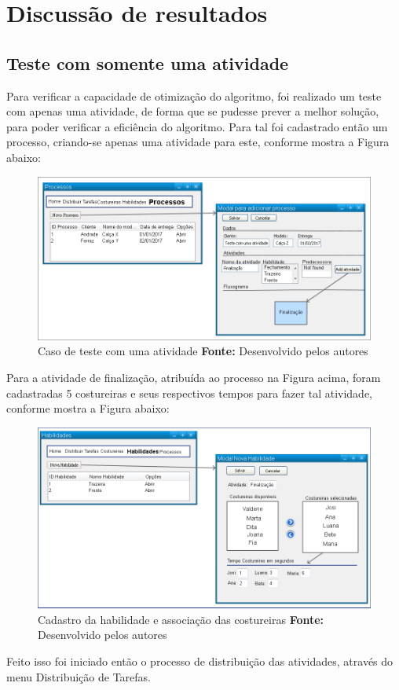 \chapter{Discussão de resultados}


\section{Teste com somente uma atividade}
\par Para verificar a capacidade de otimização do algoritmo, foi realizado um teste com apenas uma atividade,
de forma que se pudesse prever a melhor solução, para poder verificar a eficiência do algoritmo. Para tal foi 
cadastrado então um processo, criando-se apenas uma atividade para este, conforme mostra a Figura abaixo:

\begin{figure}[h!]
	\centerline{\includegraphics[scale=0.4]{./imagens/test_case_1.png}}
	\caption[Caso de teste]
	{Caso de teste com uma atividade \textbf{Fonte:} Desenvolvido pelos autores}
	\label{fig:exemplo1}
\end{figure}

\par Para a atividade de finalização, atribuída ao processo na Figura acima, foram cadastradas 5 costureiras e seus respectivos
tempos para fazer tal atividade, conforme mostra a Figura abaixo:

\begin{figure}[h!]
	\centerline{\includegraphics[scale=0.4]{./imagens/test_case_1_habilidades.png}}
	\caption[Caso de teste Habilidade]
	{Cadastro da habilidade e associação das costureiras \textbf{Fonte:} Desenvolvido pelos autores}
	\label{fig:exemplo1}
\end{figure}

\par Feito isso foi iniciado então o processo de distribuição das atividades, através do menu Distribuição de Tarefas.


